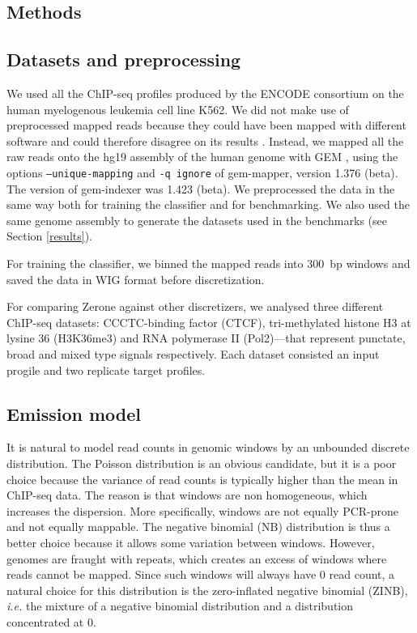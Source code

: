 \documentclass{bioinfo}
\begin{document}
\begin{methods}
\section{Methods}

\subsection{Datasets and preprocessing}
We used all the ChIP-seq profiles produced by the ENCODE consortium on the human
myelogenous leukemia cell line K562. We did not make use of preprocessed mapped
reads because they could have been mapped with different software and could
therefore disagree on its results \citep{pmid21059603}. Instead, we mapped all
the raw reads onto the hg19 assembly of the human genome with GEM
\citep{pmid23103880}, using the options \texttt{--unique-mapping} and
\texttt{-q ignore} of gem-mapper, version 1.376 (beta). The version of
gem-indexer was 1.423 (beta). We preprocessed the data in the same
way both for training the classifier and for benchmarking. We also used the
same genome assembly to generate the datasets used in the benchmarks (see
Section \ref{results}).

For training the classifier, we binned the mapped reads into 300~bp windows and
saved the data in WIG format before discretization.

For comparing Zerone against other discretizers, we analysed three different
ChIP-seq datasets: CCCTC-binding factor (CTCF), tri-methylated histone H3 at
lysine 36 (H3K36me3) and RNA polymerase II (Pol2)---that represent punctate,
broad and mixed type signals respectively. Each dataset consisted an input
progile and two replicate target profiles.

\subsection{Emission model}
It is natural to model read counts in genomic windows by an unbounded
discrete distribution. The Poisson distribution is an obvious candidate,
but it is a poor choice because the variance of read counts is typically
higher than the mean in ChIP-seq data. The reason is that windows are non
homogeneous, which increases the dispersion. More specifically, windows
are not equally PCR-prone and not equally mappable. The negative binomial
(NB) distribution is thus a better choice because it allows some variation
between windows. However, genomes are fraught with repeats, which creates
an excess of windows where reads cannot be mapped. Since such windows
will always have 0 read count, a natural choice for this distribution is
the zero-inflated negative binomial (ZINB), \textit{i.e.} the mixture of
a negative binomial distribution and a distribution concentrated at 0.


\end{methods}
\end{document}
